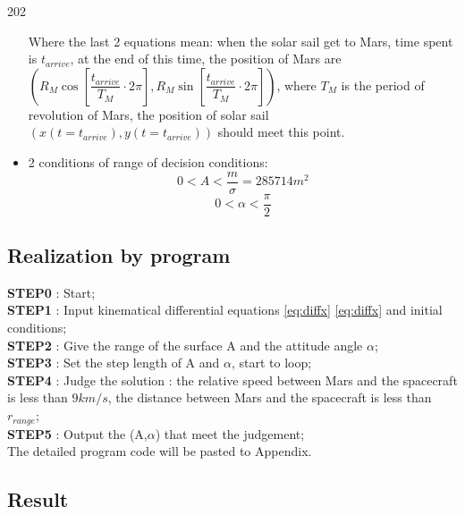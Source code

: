 \documentclass[../Paper.tex]{subfiles}
\begin{document}
\begin{dingautolist}{202}
\begin{itemize}
Where the last 2 equations mean: when the solar sail get to Mars, time spent is $ t_{arrive} $,
at the end of this time, the position of Mars are  
$ \left( R_{M} \cos{ \left[ \dfrac{t_{arrive}}{T_{M}} \cdot 2\pi \right] } ,
 R_{M} \sin{ \left[ \dfrac{t_{arrive}}{T_{M}} \cdot 2\pi \right] } \right) $, 
where $ T_{M} $ is the period of revolution of Mars, the position of solar sail $( x(t=t_{arrive}) , y(t=t_{arrive}) )$ 
should meet this point.

\item 
2 conditions of range of decision conditions:
$$ 0 < A < \dfrac{m}{\sigma} = 285714m^2 $$
$$ 0 < \alpha < \dfrac{\pi}{2} $$
\end{itemize}

\end{dingautolist}

\subsection{Realization by program}


\textbf{STEP0} : Start;\\[1mm]

\textbf{STEP1} : Input kinematical differential equations \eqref{eq:diffx} \eqref{eq:diffx} and initial conditions;\\[1mm]

\textbf{STEP2} : Give the range of the surface A and the attitude angle $\alpha$;\\[1mm]

\textbf{STEP3} : Set the step length of A and $\alpha$, start to loop;\\[1mm]

\textbf{STEP4} : Judge the solution : the relative speed between Mars and the spacecraft is less 
than $9km/s$, the distance between Mars and the spacecraft is less than $r_{range}$;\\[1mm]

\textbf{STEP5} : Output the (A,$\alpha$) that meet the judgement;\\[1mm]

The detailed program code will be pasted to Appendix.

\subsection{Result}
\end{document}
